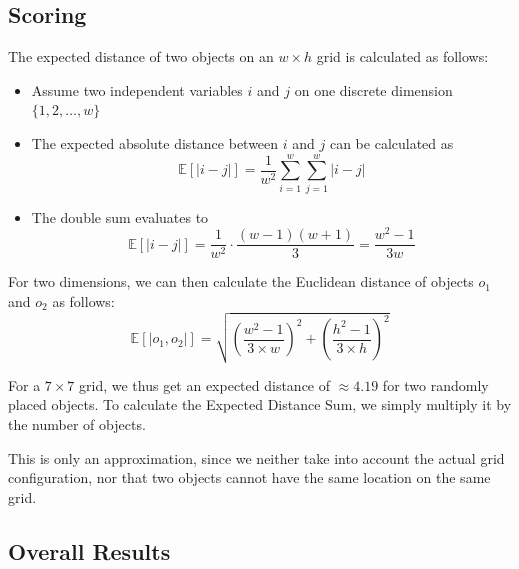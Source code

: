 \documentclass[../main.tex]{subfiles}
\begin{document}
\subsection{Scoring}\label{clean_up:scoring}
The expected distance of two objects on an $w\times h$ grid is calculated as follows:

\begin{itemize}
    \item Assume two independent variables $i$ and $j$ on one discrete dimension $\{1, 2, \dots, w\}$
    \item The expected absolute distance between $i$ and $j$ can be calculated as
    $$\mathbb{E}[|i - j|] = \frac{1}{w^2} \sum_{i=1}^{w} \sum_{j=1}^{w} |i - j|$$
    \item The double sum evaluates to
    $$\mathbb{E}[|i - j|] = \frac{1}{w^2} \cdot \frac{(w-1)(w+1)}{3} = \frac{w^2 - 1}{3w}$$
\end{itemize}

For two dimensions, we can then calculate the Euclidean distance of objects $o_1$ and $o_2$ as follows:
$$\mathbb{E}[|o_1, o_2|] = \sqrt{\left(\frac{w^2 - 1}{3 \times w}\right)^2 + \left(\frac{h^2 - 1}{3 \times h}\right)^2}$$

For a $7 \times 7$ grid, we thus get an expected distance of $\approx 4.19$ for two randomly placed objects. To calculate the Expected Distance Sum, we simply multiply it by the number of objects.

This is only an approximation, since we neither take into account the actual grid configuration, nor that two objects cannot have the same location on the same grid.

\subsection{Overall Results}
\end{document}
